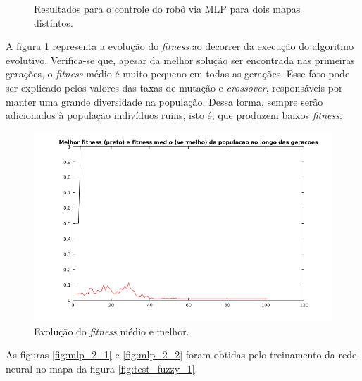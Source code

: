 \begin{figure}[h!]
	
	\caption{Resultados para o controle do robô via MLP
	para dois mapas distintos.}
	\end{figure} 
	
	\FloatBarrier
	
	A figura \ref{fig:fitness_mlp} representa a evolução do \textit{fitness} ao
	decorrer da execução do algoritmo evolutivo. Verifica-se que, apesar da melhor
	solução ser encontrada nas primeiras gerações, o \textit{fitness} médio é muito
	pequeno em todas as gerações. Esse fato pode ser explicado pelos valores das
	taxas de mutação e \textit{crossover}, responsáveis por manter uma grande
	diversidade na população. Dessa forma, sempre serão adicionados à população
	indivíduos ruins, isto é, que produzem baixos \textit{fitness}.
	
	\FloatBarrier
	
	\begin{figure}[h]
    \centering
    \includegraphics[scale=0.65]{mlp_robot/fitness}
    \caption{\label{fig:fitness_mlp}Evolução do \textit{fitness} médio e
    melhor.}
	\end{figure}  
	
	\FloatBarrier
	
	As figuras \ref{fig:mlp_2_1} e \ref{fig:mlp_2_2} foram obtidas pelo
	treinamento da rede neural no mapa da figura \ref{fig:test_fuzzy_1}.  
	
	\FloatBarrier
			    
